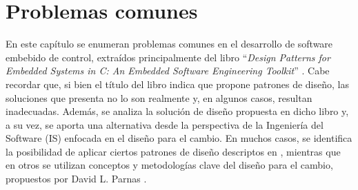 

%
%

%


\chapter{Problemas comunes}
\label{problemasComunes}

En este capítulo se enumeran problemas comunes en el desarrollo de software embebido de control, extraídos principalmente del libro ``\textit{Design Patterns for Embedded Systems in C: An Embedded Software Engineering Toolkit}'' \cite{douglass}. Cabe recordar que, si bien el título del libro indica que propone patrones de diseño, las soluciones que presenta no lo son realmente y, en algunos casos, resultan inadecuadas. Además, se analiza la solución de diseño propuesta en dicho libro y, a su vez, se aporta una alternativa desde la perspectiva de la Ingeniería del Software (\gls{IS}) enfocada en el diseño para el cambio. En muchos casos, se identifica la posibilidad de aplicar ciertos patrones de diseño descriptos en \cite{Gamma:1995:DPE:186897}, mientras que en otros se utilizan conceptos y metodologías clave del diseño para el cambio, propuestos por David L. Parnas \cite{Parnas02, Parnas1972, parnas1977abstract}.


